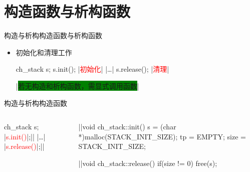 \section[构造与析构]{构造函数与析构函数}\label{sec:chap03-sec02}
\begin{frame}[t, fragile]{构造与析构}{构造函数与析构函数}%
  \begin{itemize}
  \item \alert{初始化}和\alert{清理工作}\\
    \vspace{2ex}
    \begin{minipage}{0.45\linewidth}
    \end{minipage}\qquad
    \begin{minipage}{0.45\linewidth}
      \begin{cpptt}
ch_stack s;
s.init();       |\textcolor{red}{初始化}|
|\ldots|
s.release();    |\textcolor{red}{清理}|

|\colorbox{green}{若无构造和析构函数，需显式调用函数}|
      \end{cpptt}
    \end{minipage}
  \end{itemize}
\end{frame}
\begin{frame}[t, fragile]{构造与析构}{构造函数}%
  \begin{center}
    \begin{columns}
      \begin{column}{0.3\linewidth}
        \begin{cpptt}
ch_stack s;
|\textcolor{red}{s.init()}|;||
|\ldots|
|\textcolor{red}{s.release()}|;||
        \end{cpptt}
      \end{column}
      \begin{column}{0.5\linewidth}
        \begin{cpptt}
||void ch_stack::init()
{
    s = (char *)malloc(STACK_INIT_SIZE);
    tp = EMPTY;
    size = STACK_INIT_SIZE;
}
        \end{cpptt}
        \begin{cpptt}
||void ch_stack::release()
{
    if(size != 0)
    {
        free(s);
    }
}
        \end{cpptt}
      \end{column}
    \end{columns}
  \end{center}  
\end{frame}

